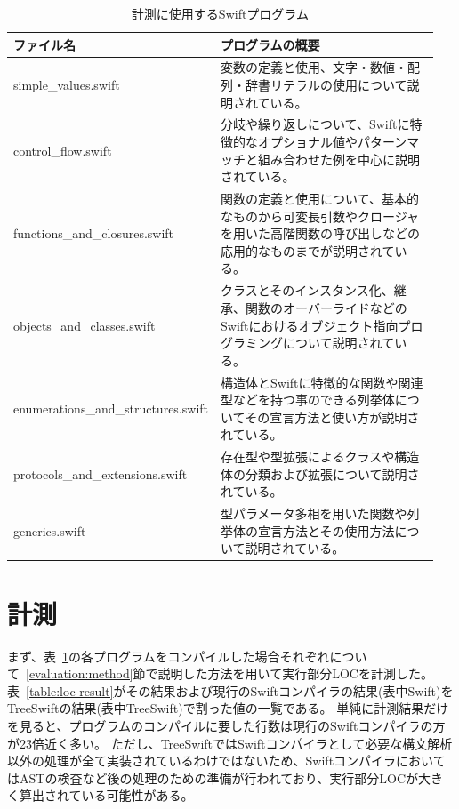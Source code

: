 \begin{table}[!hbtp]
    \begin{center}
        \caption{計測に使用するSwiftプログラム}
        \begin{tabular}{|p{0.4\linewidth}|p{0.55\linewidth}|}
            \hline
            ファイル名 & プログラムの概要\\
            \hline
            \hline
            simple\_values.swift & 変数の定義と使用、文字・数値・配列・辞書リテラルの使用について説明されている。\\
            \hline
            control\_flow.swift & 分岐や繰り返しについて、Swiftに特徴的なオプショナル値やパターンマッチと組み合わせた例を中心に説明されている。\\
            \hline
            functions\_and\_closures.swift & 関数の定義と使用について、基本的なものから可変長引数やクロージャを用いた高階関数の呼び出しなどの応用的なものまでが説明されている。\\
            \hline
            objects\_and\_classes.swift & クラスとそのインスタンス化、継承、関数のオーバーライドなどのSwiftにおけるオブジェクト指向プログラミングについて説明されている。\\
            \hline
            enumerations\_and\_structures.swift & 構造体とSwiftに特徴的な関数や関連型などを持つ事のできる列挙体についてその宣言方法と使い方が説明されている。\\
            \hline
            protocols\_and\_extensions.swift & 存在型や型拡張によるクラスや構造体の分類および拡張について説明されている。\\
            \hline
            generics.swift & 型パラメータ多相を用いた関数や列挙体の宣言方法とその使用方法について説明されている。\\
            \hline
        \end{tabular}
        \label{table:complexity-measure}
    \end{center}
\end{table}

\section{計測}

まず、表~\ref{table:complexity-measure}の各プログラムをコンパイルした場合それぞれについて~\ref{evaluation:method}節で説明した方法を用いて実行部分LOCを計測した。
表~\ref{table:loc-result}がその結果および現行のSwiftコンパイラの結果(表中Swift)をTreeSwiftの結果(表中TreeSwift)で割った値の一覧である。
単純に計測結果だけを見ると、プログラムのコンパイルに要した行数は現行のSwiftコンパイラの方が2\~3倍近く多い。
ただし、TreeSwiftではSwiftコンパイラとして必要な構文解析以外の処理が全て実装されているわけではないため、SwiftコンパイラにおいてはASTの検査など後の処理のための準備が行われており、実行部分LOCが大きく算出されている可能性がある。

